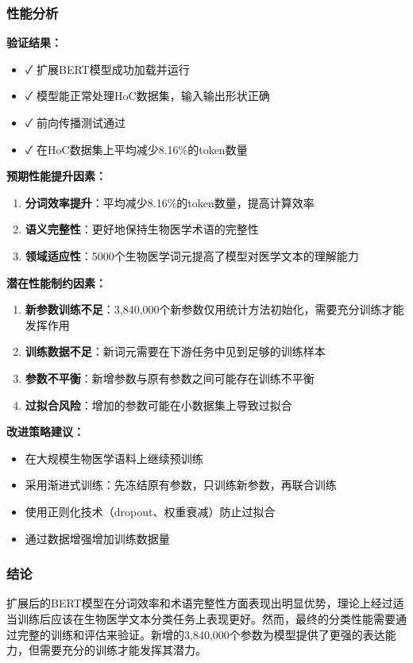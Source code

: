 \documentclass[12pt,letterpaper]{article}
\begin{document}
\subsubsection{性能分析}

\textbf{验证结果：}
\begin{itemize}
    \item ✓ 扩展BERT模型成功加载并运行
    \item ✓ 模型能正常处理HoC数据集，输入输出形状正确
    \item ✓ 前向传播测试通过
    \item ✓ 在HoC数据集上平均减少8.16\%的token数量
\end{itemize}

\textbf{预期性能提升因素：}
\begin{enumerate}
    \item \textbf{分词效率提升}：平均减少8.16\%的token数量，提高计算效率
    \item \textbf{语义完整性}：更好地保持生物医学术语的完整性
    \item \textbf{领域适应性}：5000个生物医学词元提高了模型对医学文本的理解能力
\end{enumerate}

\textbf{潜在性能制约因素：}
\begin{enumerate}
    \item \textbf{新参数训练不足}：3,840,000个新参数仅用统计方法初始化，需要充分训练才能发挥作用
    \item \textbf{训练数据不足}：新词元需要在下游任务中见到足够的训练样本
    \item \textbf{参数不平衡}：新增参数与原有参数之间可能存在训练不平衡
    \item \textbf{过拟合风险}：增加的参数可能在小数据集上导致过拟合
\end{enumerate}

\textbf{改进策略建议：}
\begin{itemize}
    \item 在大规模生物医学语料上继续预训练
    \item 采用渐进式训练：先冻结原有参数，只训练新参数，再联合训练
    \item 使用正则化技术（dropout、权重衰减）防止过拟合
    \item 通过数据增强增加训练数据量
\end{itemize}

\subsubsection{结论}

扩展后的BERT模型在分词效率和术语完整性方面表现出明显优势，理论上经过适当训练后应该在生物医学文本分类任务上表现更好。然而，最终的分类性能需要通过完整的训练和评估来验证。新增的3,840,000个参数为模型提供了更强的表达能力，但需要充分的训练才能发挥其潜力。 
\end{document}
